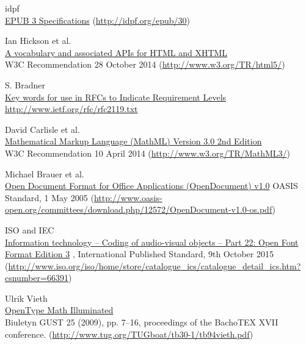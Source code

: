 \begin{thebibliography}{25}
idpf \\
\href{http://idpf.org/epub/30}{EPUB 3 Specifications}
(\href{http://idpf.org/epub/30}{http://idpf.org/epub/30})

Ian Hickson et al. \\
\href{http://www.w3.org/TR/html5/}{A vocabulary and associated APIs for HTML and XHTML} \\
W3C Recommendation 28 October 2014 (\href{http://www.w3.org/TR/html5/}{http://www.w3.org/TR/html5/})

S. Bradner \\
\href{http://www.ietf.org/rfc/rfc2119.txt}{Key words for use in RFCs to Indicate Requirement Levels} \\
\href{http://www.ietf.org/rfc/rfc2119.txt}{http://www.ietf.org/rfc/rfc2119.txt}

David Carlisle et al. \\
\href{http://www.w3.org/TR/MathML3/}{Mathematical Markup Language (MathML) Version 3.0 2nd Edition} \\
W3C Recommendation 10 April 2014 (\href{http://www.w3.org/TR/MathML3/}{http://www.w3.org/TR/MathML3/})

Michael Brauer et al. \\
\href{http://www.oasis-open.org/committees/download.php/12572/OpenDocument-v1.0-os.pdf}{Open Document Format for Office Applications (OpenDocument) v1.0}
OASIS Standard, 1 May 2005 (\href{http://www.oasis-open.org/committees/download.php/12572/OpenDocument-v1.0-os.pdf}{http://www.oasis-open.org/committees/download.php/12572/OpenDocument-v1.0-os.pdf})

ISO and IEC \\
\href{http://www.iso.org/iso/home/store/catalogue\_ics/catalogue\_detail\_ics.htm?csnumber=66391}{Information technology -- Coding of audio-visual objects -- Part 22: Open Font Format Edition 3} , International Published Standard, 9th October 2015 (\href{http://www.iso.org/iso/home/store/catalogue\_ics/catalogue\_detail\_ics.htm?csnumber=66391}{http://www.iso.org/iso/home/store/catalogue\_ics/catalogue\_detail\_ics.htm?csnumber=66391})

Ulrik Vieth \\
\href{http://www.tug.org/TUGboat/tb30-1/tb94vieth.pdf}{OpenType Math Illuminated} \\
Biuletyn GUST 25 (2009), pp. 7–16, proceedings of the BachoTEX XVII conference.
(\href{http://www.tug.org/TUGboat/tb30-1/tb94vieth.pdf}{http://www.tug.org/TUGboat/tb30-1/tb94vieth.pdf})


\end{thebibliography}
